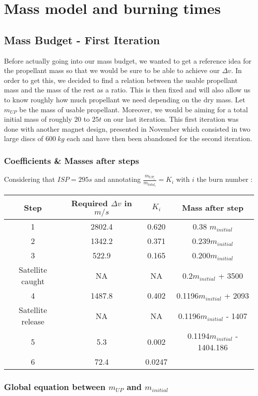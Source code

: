 \chapter{Mass model and burning times}
\section{Mass Budget - First Iteration}

\qquad Before actually going into our mass budget, we wanted to get a reference
idea for the propellant mass so that we would be sure to be able to
achieve our \(\Delta v\). In order to get this, we decided to find a
relation between the usable propellant mass and the mass of the rest as
a ratio. This is then fixed and will also allow us to know roughly how
much propellant we need depending on the dry mass. Let \(m_{UP}\) be the
mass of usable propellant. Moreover, we would be aiming for a total initial mass of roughly $20$ to $25t$ on our last iteration. This first iteration was done with another magnet design, presented in November which consisted in two large discs of $600\ kg$ each and have then been abandoned for the second iteration.


\subsection{Coefficients \& Masses after steps}

Considering that \(ISP = 295s\) and annotating
\(\frac{m_{UP_i}}{m_{total_i}} = K_i\) with \(i\) the burn number :

\begin{longtable}[]{@{}cccc@{}}
\toprule
Step & Required \(\Delta v\) in \(m/s\) & \(K_i\) & Mass after
step\tabularnewline
\midrule
\endhead
1 & 2802.4 & 0.620 & 0.38 \(m_{initial}\)\tabularnewline
2 & 1342.2 & 0.371 & 0.239\(m_{initial}\)\tabularnewline
3 & 522.9 & 0.165 & 0.200\(m_{initial}\)\tabularnewline
Satellite caught & NA & NA & 0.2\(m_{initial}\) + 3500\tabularnewline
4 & 1487.8 & 0.402 & 0.1196\(m_{initial}\) + 2093\tabularnewline
Satellite release & NA & NA & 0.1196\(m_{initial}\) -
1407\tabularnewline
5 & 5.3 & 0.002 & 0.1194\(m_{initial}\) - 1404.186\tabularnewline
6 & 72.4 & 0.0247 &\tabularnewline
\bottomrule
\end{longtable}


\subsection{Global equation between $m_{UP}$ and
	$m_{initial}$}

